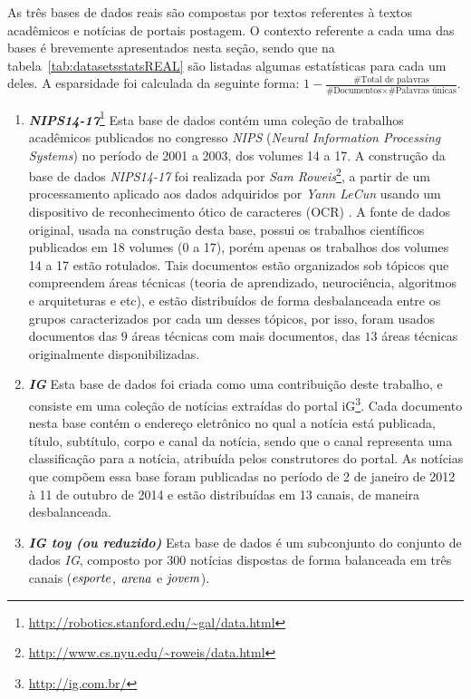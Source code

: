 \documentclass[
    12pt,                %
    oneside,            %
    a4paper,            %
    english,            %
    brazil                %
    ]{abntex2ppgsi}
\begin{document}
As três bases de dados reais são compostas por textos referentes à textos acadêmicos e notícias de portais postagem.
O contexto referente a cada uma das bases é brevemente apresentados nesta seção, sendo que na tabela~\ref{tab:datasetsstatsREAL} são listadas algumas estatísticas para cada um deles.
A esparsidade foi calculada da seguinte forma: $1 - \frac{ \text{\# Total de palavras} }{ \text{\# Documentos} \times \text{\# Palavras únicas} }$.

\begin{enumerate}
    \item \textbf{\textit{NIPS14-17}}\footnote{\url{http://robotics.stanford.edu/~gal/data.html}} Esta base de dados contém uma coleção de trabalhos acadêmicos publicados no congresso \textit{NIPS} (\textit{Neural Information Processing Systems}) no período de 2001 a 2003, dos volumes 14 a 17.
    A construção da base de dados \textit{NIPS14-17} foi realizada por \textit{Sam Roweis}\footnote{\url{http://www.cs.nyu.edu/~roweis/data.html}}, a partir de um processamento aplicado aos dados adquiridos por \textit{Yann LeCun} usando um dispositivo de reconhecimento ótico de caracteres (OCR) \cite{Chechik2007}. A fonte de dados original, usada na construção desta base, possui os trabalhos científicos publicados em 18 volumes (0 a 17), porém apenas os trabalhos dos volumes 14 a 17 estão rotulados. Tais documentos estão organizados sob tópicos que compreendem áreas técnicas (teoria de aprendizado, neurociência, algoritmos e arquiteturas e etc), e estão distribuídos de forma desbalanceada entre os grupos caracterizados por cada um desses tópicos, por isso, foram usados documentos das $9$ áreas técnicas com mais documentos, das $13$ áreas técnicas originalmente disponibilizadas.

    \item \textbf{\textit{IG}} Esta base de dados foi criada como uma contribuição deste trabalho, e consiste em uma coleção de notícias extraídas do portal iG\footnote{\url{http://ig.com.br/}}.
    Cada documento nesta base contém o endereço eletrônico no qual a notícia está publicada, título, subtítulo, corpo e canal da notícia, sendo que o canal representa uma classificação para a notícia, atribuída pelos construtores do portal. As notícias que compõem essa base foram publicadas no período de 2 de janeiro de 2012 à 11 de outubro de 2014 e estão distribuídas em 13 canais, de maneira desbalanceada.

    \item \textbf{\textit{IG toy (ou reduzido)}} Esta base de dados é um subconjunto do conjunto de dados \textit{IG}, composto por $300$ notícias dispostas de forma balanceada em três canais ($\text{\textit{esporte}}$, $\text{\textit{arena}}$ e $\text{\textit{jovem}}$).

\end{enumerate}
\end{document}
